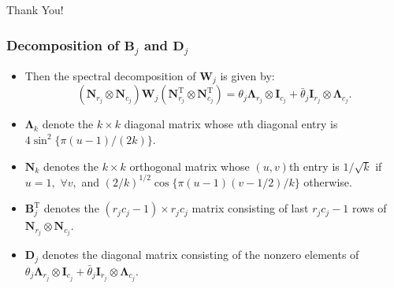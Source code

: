 \documentclass{beamer}
\newcommand{\bB}{\mathbf{B}}
\newcommand{\bD}{\mathbf{D}}
\newcommand{\bLambda}{{\bm\Lambda}}
\newcommand{\bN}{\mathbf{N}}
\newcommand{\bW}{\mathbf{W}}
\newcommand{\sT}{\mathrm{T}}
\begin{document}
\begin{frame}%
\begin{center}
\Huge Thank You!
\end{center}
\end{frame}




\begin{frame}
	\frametitle{Decomposition of $\bB_{j}$ and $\bD_j$}

  	\begin{itemize}
         \item Then the spectral decomposition of $\bW_j$ is given by:
         $$( \bN_{r_j}\otimes\bN_{c_j}) \bW_j ( \bN_{r_j}^\sT \otimes\bN_{c_j}^\sT) = \theta_j\bLambda_{r_j}\otimes\mathbf{I}_{c_j} + \bar\theta_j\mathbf{I}_{r_j}\otimes\bLambda_{c_j}.$$
         \item $\bLambda_k$ denote the $k\times k$ diagonal matrix  whose $u$th diagonal entry is $4\sin^2\{\pi(u-1)/(2k)\}.$
	\item $\bN_k$ denotes the $k\times k$ orthogonal matrix whose $(u,v)$th entry is $1/\sqrt{k}$ if $u=1,$ $\forall v,$ and $(2/k)^{1/2}\cos\{\pi(u-1)(v-1/2)/k\}$ otherwise.
	\item  $\bB_{j}^{\sT}$ denotes the $(r_jc_j-1)\times r_jc_j$ matrix consisting of last $r_jc_j-1$ rows of $ \bN_{r_j}\otimes\bN_{c_j}$.
         \item $\bD_j$ denotes the diagonal matrix consisting of the nonzero elements of $\theta_j\bLambda_{r_j}\otimes\mathbf{I}_{c_j} + \bar\theta_j\mathbf{I}_{r_j}\otimes\bLambda_{c_j}$.
	\end{itemize}
	
\end{frame}
\end{document}

